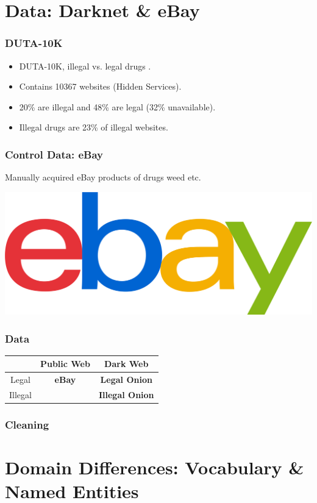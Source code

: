 \documentclass[t,xcolor={svgnames,table}]{beamer}
\begin{document}
\section{Data: Darknet \& eBay}

\begin{frame}
	\frametitle{DUTA-10K}
	\begin{itemize}\setlength\itemsep{1em}
		\item DUTA-10K, illegal vs. legal drugs \cite{AlNabki19}.
		\item Contains 10367 websites (Hidden Services).
		\item 20\% are illegal and 48\% are legal (32\% unavailable).
		\item Illegal drugs are 23\% of illegal websites.
	\end{itemize}
\end{frame}

\begin{frame}
	\frametitle{Control Data: eBay}
	Manually acquired eBay products of drugs weed etc. %
	\vfill
	
	\begin{center}
	\includegraphics[width=.5\textwidth]{ebay.png}
	\end{center}
\end{frame}

\begin{frame}
	\frametitle{Data}
	\begin{center}
	\def\arraystretch{2}
	\begin{tabular}{c|cc}
	& Public Web & Dark Web \\ 
	\hline
	Legal & \textbf{\color{yellow} eBay} & \textbf{\color{green} Legal Onion} \\
	Illegal & & \textbf{\color{red} Illegal Onion}
	\end{tabular}
	\end{center}
\end{frame}

\begin{frame}
	\frametitle{Cleaning}
\end{frame}

\section{Domain Differences: Vocabulary \& Named Entities}
\end{document}
